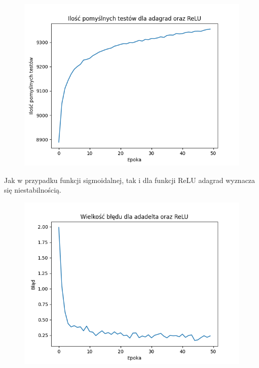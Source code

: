 \documentclass{article}
\begin{document}
\begin{figure}[!htb]
  \centering
  \includegraphics[width=\linewidth]{test_adagrad_ReLU.png}
\end{figure}

Jak w przypadku funkcji sigmoidalnej, tak i dla funkcji ReLU adagrad wyznacza się niestabilnością.

\begin{figure}[!htb]
  \centering
  \includegraphics[width=\linewidth]{error_adadelta_ReLU.png}
\end{figure}
\end{document}
